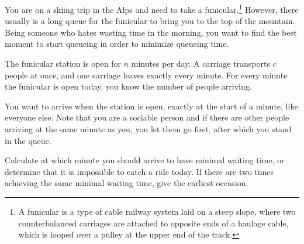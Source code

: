 






You are on a skiing trip in the Alps and need to take a funicular.\footnote{%
    A funicular is a type of cable railway system laid on a steep slope,
    where two counterbalanced carriages are attached to opposite ends of a haulage cable,
    which is looped over a pulley at the upper end of the track.
}
However, there usually is a long queue for the funicular to bring you to the top of the mountain.
Being someone who hates wasting time in the morning,
you want to find the best moment to start queueing in order to minimize queueing time.

The funicular station is open for $n$ minutes per day.
A carriage transports $c$ people at once, and one carriage leaves exactly every minute.
For every minute the funicular is open today, you know the number of people arriving.

You want to arrive when the station is open, exactly at the start of a minute, like everyone else.
Note that you are a sociable person and if there are other people arriving at the same minute as you,
you let them go first, after which you stand in the queue.

Calculate at which minute you should arrive to have minimal waiting time,
or determine that it is impossible to catch a ride today.
If there are two times achieving the same minimal waiting time, give the earliest occasion.

